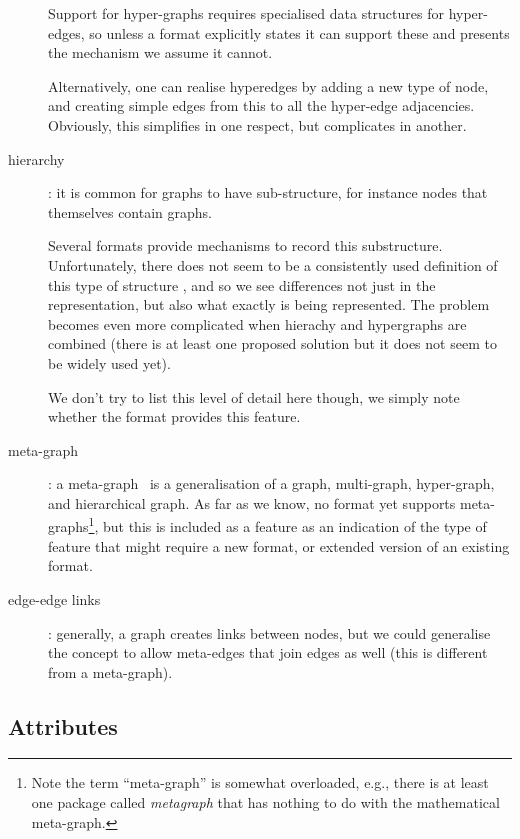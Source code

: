 \documentclass{sig-alternate}
\begin{document}
\begin{description}
  Support for hyper-graphs requires specialised data structures for
  hyper-edges, so unless a format explicitly states it can support
  these and presents the mechanism we assume it cannot.

  Alternatively, one can realise hyperedges by adding a new type of
  node, and creating simple edges from this to all the hyper-edge
  adjacencies. Obviously, this simplifies in one respect, but
  complicates in another.  

\item[hierarchy]: it is common for graphs to have sub-structure, for
  instance nodes that themselves contain graphs.

  Several formats provide mechanisms to record this
  substructure. Unfortunately, there does not seem to be a
  consistently used definition of this type of structure
  \cite{bildhauer11:_dhhtg}, and so we see differences not just in the
  representation, but also what exactly is being represented. The
  problem becomes even more complicated when hierachy and hypergraphs
  are combined \cite{kivela:_multil} (there is at least one proposed
  solution \cite{bildhauer11:_dhhtg} but it does not seem to be widely
  used yet). 

  We don't try to list this level of detail here though, we simply
  note whether the format provides this feature.

\item[meta-graph]: a meta-graph~\cite{basu07:_metag_applic} is a
  generalisation of a graph, multi-graph, hyper-graph, and
  hierarchical graph. As far as we know, no format yet supports
  meta-graphs\footnote{Note the term ``meta-graph'' is somewhat
    overloaded, e.g., there is at least one package called {\em
      metagraph} that has nothing to do with the mathematical
    meta-graph.}, but this is included as a feature as an indication
  of the type of feature that might require a new format, or extended
  version of an existing format.

\item[edge-edge links]: generally, a graph creates links between
  nodes, but we could generalise the concept to allow meta-edges that
  join edges as well (this is different from a meta-graph).

\end{description}

\subsection{Attributes}
\end{document}
